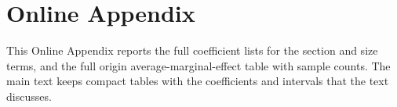 \appendix
\section*{Online Appendix}\label{sec:appendix}
\setcounter{table}{0}
\renewcommand{\thetable}{A\arabic{table}}
\setcounter{figure}{0}
\renewcommand{\thefigure}{A\arabic{figure}}

\noindent
This Online Appendix reports the full coefficient lists for the section and size terms, and the full origin average-marginal-effect table with sample counts.
The main text keeps compact tables with the coefficients and intervals that the text discusses.






